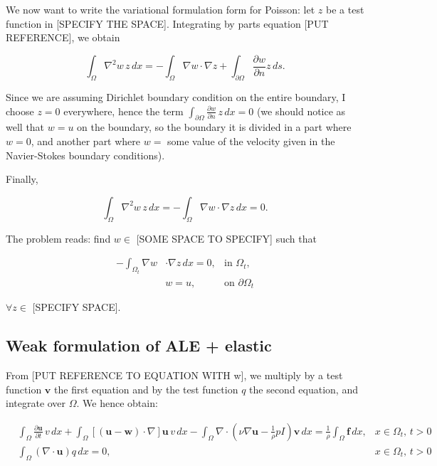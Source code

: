 \documentclass[11pt,a4paper,titlepage]{report}
\begin{document}
We now want to write the variational formulation form for Poisson: let $z$ be a test function in [SPECIFY THE SPACE]. Integrating by parts equation [PUT REFERENCE], we obtain

\[
\int_{\Omega} \nabla^2 w \, z \, dx = - \int_{\Omega} \nabla w \cdot \nabla z + \int_{\partial \Omega} \frac{\partial w}{\partial n} z \, ds.
\]

Since we are assuming Dirichlet boundary condition on the entire boundary, I choose $z = 0$ everywhere, hence the term $\int_{\partial \Omega} \frac{\partial w}{\partial n} \, z \, dx  = 0 $ (we should notice as well that $w = u$ on the boundary, so the boundary it is divided in a part where $w = 0$, and another part where $w = $ some value of the velocity given in the Navier-Stokes boundary conditions). 

Finally,

\[
\int_{\Omega} \nabla^2 w \, z \, dx = - \int_{\Omega} \nabla w \cdot \nabla z \, dx = 0.
\]

The problem reads: find $w \in$ [SOME SPACE TO SPECIFY] such that

\[
\begin{aligned}
-  \int_{\Omega_t} \nabla w & \cdot \nabla z \, dx = 0, & \text{in } \Omega_t, \\
& w = u, & \text{on } \partial \Omega_t
\end{aligned}
\]

$\forall z \in $ [SPECIFY SPACE].



\subsection{Weak formulation of  ALE + elastic}

From [PUT REFERENCE TO EQUATION WITH w], we multiply by a test function $\mathbf{v}$ the first equation and by the test function $q$ the second equation, and integrate over $\Omega$. We hence obtain:


\[
\begin{aligned}
& \int_{\Omega} \frac{\partial \mathbf{u}}{\partial t} \, v \, dx 
+ \int_{\Omega} [(\mathbf{u - w}) \cdot \nabla] \mathbf{u} \, v \, dx
- \int_{\Omega} \nabla \cdot (\nu \nabla \mathbf{u} -  \frac{1}{\rho}  pI)\mathbf{v} \, dx
=  \frac{1}{\rho} \int_{\Omega} \mathbf{f} \, dx,  & x \in \Omega_t, \, t>0 \\
& \int_{\Omega}  (\nabla \cdot \mathbf{u}) q \, dx = 0 , & x \in \Omega_t, \, t>0
\end{aligned}
\]
\end{document}
